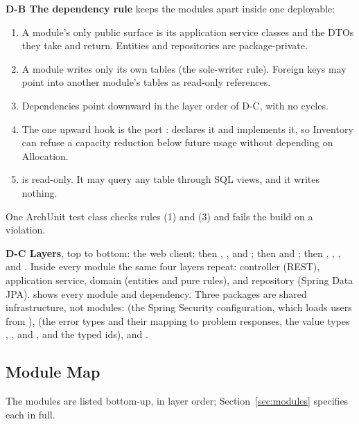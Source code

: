 \textbf{D-B The dependency rule} keeps the modules apart inside one deployable:
\begin{enumerate}[label=(\arabic*)]
  \item A module's only public surface is its application service classes and the DTOs they take and return. Entities and repositories are package-private.
  \item A module writes only its own tables (the sole-writer rule). Foreign keys may point into another module's tables as read-only references.
  \item Dependencies point downward in the layer order of D-C, with no cycles.
  \item The one upward hook is the port :  declares it and  implements it, so Inventory can refuse a capacity reduction below future usage without depending on Allocation.
  \item {} is read-only. It may query any table through SQL views, and it writes nothing.
\end{enumerate}
One ArchUnit test class checks rules (1) and (3) and fails the build on a violation.

\textbf{D-C Layers}, top to bottom: the web client; then , , and ; then  and ; then , , , and . Inside every module the same four layers repeat: controller (REST), application service, domain (entities and pure rules), and repository (Spring Data JPA).  shows every module and dependency. Three packages are shared infrastructure, not modules:  (the Spring Security configuration, which loads users from ),  (the error types and their mapping to problem responses, the value types , , and , and the typed ids), and .

\subsection{Module Map}\label{sec:arch-modules}

The modules are listed bottom-up, in layer order; Section~\ref{sec:modules} specifies each in full.

